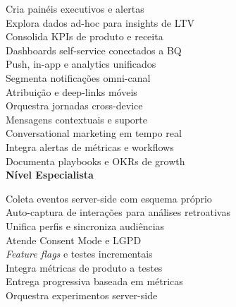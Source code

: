  Cria painéis executivos e alertas\\
 Explora dados ad-hoc para insights de LTV\\
 Consolida KPIs de produto e receita\\
 Dashboards self-service conectados a BQ\\
[0.5em]

 Push, in-app e analytics unificados\\
 Segmenta notificações omni-canal\\
 Atribuição e deep-links móveis\\
 Orquestra jornadas cross-device\\
[0.5em]

 Mensagens contextuais e suporte\\
 Conversational marketing em tempo real\\
 Integra alertas de métricas e workflows\\
 Documenta playbooks e OKRs de growth\\

\bigskip
\textbf{Nível Especialista}

 Coleta eventos server-side com esquema próprio\\
 Auto-captura de interações para análises retroativas\\
 Unifica perfis e sincroniza audiências\\
 Atende Consent Mode e LGPD\\
[0.5em]

 \textit{Feature flags} e testes incrementais\\
 Integra métricas de produto a testes\\
 Entrega progressiva baseada em métricas\\
 Orquestra experimentos server-side\\
[0.5em]

